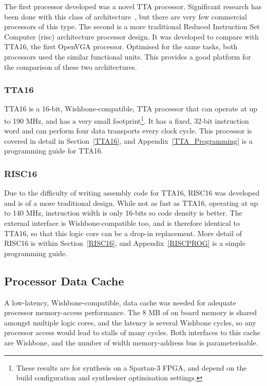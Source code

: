 The first processor developed was a novel TTA processor. Significant research has
been done with this class of architecture~\cite{corporaal1993maa,
jaaskelainen2007cta}, but there are very few commercial processors of this type.
The second is a more traditional Reduced Instruction Set
Computer
(\gls{risc}) architecture processor design. It was developed to compare with TTA16, the
first OpenVGA processor. Optimised for the same tasks, both processors used the
similar functional units. This provides a good platform for the comparison of
these two architectures.


\subsubsection{TTA16}
TTA16 is a 16-bit, Wishbone-compatible, TTA processor that can operate at up to
190 MHz, and has a very small footprint\footnote{These results are for synthesis
on a Spartan-3 FPGA, and depend on the build configuration and synthesiser
optimisation settings.}. It has a fixed, 32-bit instruction word and can perform
four data transports every clock cycle. This processor is covered in detail in
Section~\ref{TTA16}, and Appendix~\ref{TTA_Programming} is a programming guide
for TTA16.


\subsubsection{RISC16}
Due to the difficulty of writing assembly code for TTA16, RISC16 was developed
and is of a more traditional design. While not as fast as TTA16, operating at up
to 140 MHz, instruction width is only 16-bits so code density is better. The
external interface is Wishbone-compatible too, and is therefore identical to
TTA16, so that this logic core can be a drop-in replacement. More detail of
RISC16 is within Section~\ref{RISC16}, and Appendix~\ref{RISCPROG} is a simple
programming guide.


\subsection{Processor Data Cache}
A low-latency, Wishbone-compatible, data cache was needed for adequate processor
memory-access performance. The 8 MB of on board memory is shared amongst multiple
logic cores, and the latency is several Wishbone cycles, so any processor access
would lead to stalls of many cycles. Both interfaces to this cache are Wishbone,
and the number of width memory-address bus is parameterisable.


